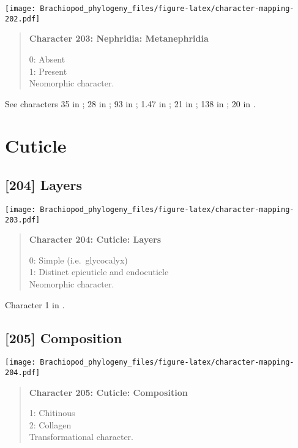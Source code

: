 \documentclass[openany]{book}
\theoremstyle{definition}
\theoremstyle{definition}
\theoremstyle{definition}
\theoremstyle{remark}
\begin{document}
\texttt{[image: Brachiopod\_phylogeny\_files/figure-latex/character-mapping-202.pdf]}

\begin{quote}
\textbf{Character 203: Nephridia: Metanephridia}

0: Absent\\
1: Present\\
Neomorphic character.
\end{quote}

See characters 35 in \citet{Rouse1999}; 28 in \citet{Haszprunar2000}; 93
in \citet{Glenner2004}; 1.47 in \citet{SPS1996}; 21 in
\citet{Grobe2007}; 138 in \citet{Rouse1999}; 20 in
\citet{Haszprunar1996}.

\section{Cuticle}\label{cuticle}

\subsection*{{[}204{]} Layers}\label{layers}

\texttt{[image: Brachiopod\_phylogeny\_files/figure-latex/character-mapping-203.pdf]}

\begin{quote}
\textbf{Character 204: Cuticle: Layers}

0: Simple (i.e.~glycocalyx)\\
1: Distinct epicuticle and endocuticle\\
Neomorphic character.
\end{quote}

Character 1 in \citet{Haszprunar1996}.

\subsection*{{[}205{]} Composition}\label{composition}

\texttt{[image: Brachiopod\_phylogeny\_files/figure-latex/character-mapping-204.pdf]}

\begin{quote}
\textbf{Character 205: Cuticle: Composition}

1: Chitinous\\
2: Collagen\\
Transformational character.
\end{quote}
\end{document}
